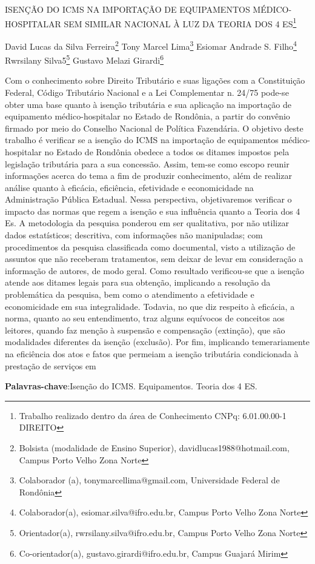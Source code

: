 \documentclass[article,12pt,onesidea,4paper,english,brazil]{abntex2}
\begin{document}
	
	
	\frenchspacing 
	
	\begin{center}
		\LARGE ISENÇÃO DO ICMS NA IMPORTAÇÃO DE EQUIPAMENTOS MÉDICO-HOSPITALAR SEM SIMILAR NACIONAL À LUZ DA TEORIA DOS 4 ES\footnote{Trabalho realizado dentro da área de Conhecimento CNPq: 6.01.00.00-1 DIREITO}
		
		\normalsize
	David Lucas da Silva Ferreira\footnote{Bolsista (modalidade de Ensino Superior), davidlucas1988@hotmail.com, Campus Porto Velho Zona
		Norte} 
	Tony Marcel Lima\footnote{Colaborador (a), tonymarcellima@gmail.com, Universidade Federal de Rondônia} 
	Esiomar Andrade S. Filho\footnote{Colaborador(a), esiomar.silva@ifro.edu.br, Campus Porto Velho Zona Norte} \\
	Rwrsilany Silva5\footnote{Orientador(a), rwrsilany.silva@ifro.edu.br, Campus Porto Velho Zona Norte}
	Gustavo Melazi Girardi\footnote{Co-orientador(a), gustavo.girardi@ifro.edu.br, Campus Guajará Mirim}  
	\end{center}
	
	\noindent Com o conhecimento sobre Direito Tributário e suas ligações com a Constituição
	Federal, Código Tributário Nacional e a Lei Complementar n. 24/75 pode-se obter
	uma base quanto à isenção tributária e sua aplicação na importação de equipamento
	médico-hospitalar no Estado de Rondônia, a partir do convênio firmado por meio do
	Conselho Nacional de Política Fazendária. O objetivo deste trabalho é verificar se a
	isenção do ICMS na importação de equipamentos médico-hospitalar no Estado de
	Rondônia obedece a todos os ditames impostos pela legislação tributária para a sua
	concessão. Assim, tem-se como escopo reunir informações acerca do tema a fim de
	produzir conhecimento, além de realizar análise quanto à eficácia, eficiência,
	efetividade e economicidade na Administração Pública Estadual. Nessa perspectiva,
	objetivaremos verificar o impacto das normas que regem a isenção e sua influência
	quanto a Teoria dos 4 Es. A metodologia da pesquisa ponderou em ser qualitativa,
	por não utilizar dados estatísticos; descritiva, com informações não manipuladas;
	com procedimentos da pesquisa classificada como documental, visto a utilização de
	assuntos que não receberam tratamentos, sem deixar de levar em consideração a
	informação de autores, de modo geral. Como resultado verificou-se que a isenção
	atende aos ditames legais para sua obtenção, implicando a resolução da
	problemática da pesquisa, bem como o atendimento a efetividade e economicidade
	em sua integralidade. Todavia, no que diz respeito à eficácia, a norma, quanto ao
	seu entendimento, traz alguns equívocos de conceitos aos leitores, quando faz
	menção à suspensão e compensação (extinção), que são modalidades diferentes da
	isenção (exclusão). Por fim, implicando temerariamente na eficiência dos atos e
	fatos que permeiam a isenção tributária condicionada à prestação de serviços em
	
	\vspace{\onelineskip}
	
	\noindent
	\textbf{Palavras-chave}:Isenção do ICMS. Equipamentos. Teoria dos 4 ES.
	
\end{document}

